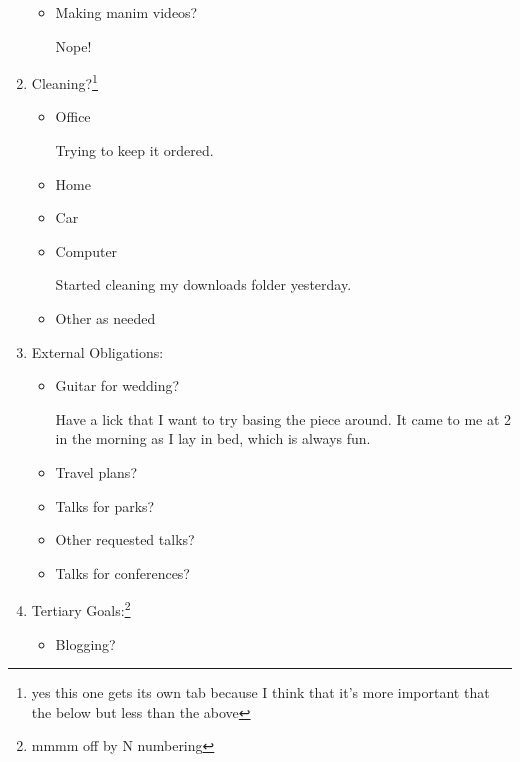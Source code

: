 \documentclass[12pt]{article}
\renewcommand{\,}{\textsuperscript{,}}
\begin{document}
\begin{enumerate}
\begin{itemize}
\item Making manim videos?

Nope!

\end{itemize}

\item Cleaning?\footnote{yes this one gets its own tab because I think that it's more important that the below but less than the above}

\begin{itemize}

\item Office

Trying to keep it ordered.

\item Home

\item Car

\item Computer

Started cleaning my downloads folder yesterday.

\item Other as needed

\end{itemize}

\item External Obligations:

\begin{itemize}

\item Guitar for wedding?

Have a lick that I want to try basing the piece around.  
It came to me at 2 in the morning as I lay in bed, which is always fun.

\item Travel plans?

\item Talks for parks?

\item Other requested talks?

\item Talks for conferences?

\end{itemize}

\item Tertiary Goals:\footnote{mmmm off by N numbering}

\begin{itemize}

\item Blogging?


\end{itemize}
\end{enumerate}
\end{document}
